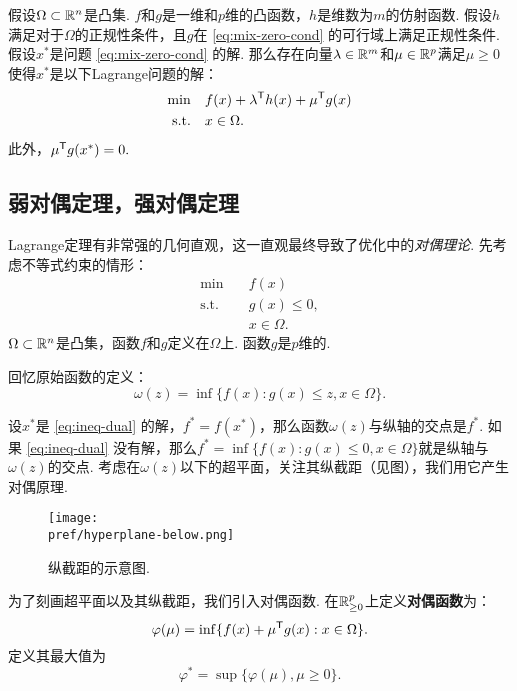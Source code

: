 \begin{theorem}\label{thm:mix-zero-cond}
假设$\Omega\subset \mathbb{R}^n$是凸集. $f$和${g}$是一维和$p$维的凸函数，${h}$是维数为$m$的仿射函数. 假设${h}$满足对于$\Omega$的正规性条件，且$g$在 \eqref{eq:mix-zero-cond} 的可行域上满足正规性条件. 假设${x^\ast}$是问题 \eqref{eq:mix-zero-cond} 的解. 那么存在向量${\lambda}\in \mathbb{R}^m$和${\mu}\in \mathbb{R}^p$满足${\mu}\ge {0}$使得${x^\ast}$是以下Lagrange问题的解：
\begin{align*}
\min\quad &f({x})+\lambda^{\mathsf{T}} h(x)+\mu^{\mathsf{T}} g(x) \\
\text{s.t.}\quad& x\in\Omega.
\end{align*}
此外，${\mu^{\mathsf{T}} g(x^\ast)}=0.$
\end{theorem}



\subsection{弱对偶定理，强对偶定理}
Lagrange定理有非常强的几何直观，这一直观最终导致了优化中的\emph{对偶理论}. 先考虑不等式约束的情形：
\begin{equation}
    \begin{aligned}
    \min\quad & f({x})\\
    \text{s.t.}\quad& {g(x)\le 0},\\
    &{x}\in\Omega.
\end{aligned}\label{eq:ineq-dual}
\end{equation}
$\Omega\subset \mathbb{R}^n$是凸集，函数$f$和${g}$定义在$\Omega$上. 函数${g}$是$p$维的. 

回忆原始函数的定义：
        $$\omega({z})=\inf \{f({x}):g(x)\le z,x\in\Omega\}.$$

设$x^\ast$是 \eqref{eq:ineq-dual} 的解，$f^\ast=f(x^\ast)$，那么函数$\omega(z)$与纵轴的交点是$f^*$. 如果 \eqref{eq:ineq-dual} 没有解，那么$f^*=\inf\{f(x):g(x)\leq 0,x\in\Omega\}$就是纵轴与$\omega(z)$的交点. 考虑在$\omega(z)$以下的超平面，关注其纵截距（见图），我们用它产生对偶原理.
\begin{figure}
    \centering
    \texttt{[image: \\pref/hyperplane-below.png]}
    \caption{纵截距的示意图.}
    \label{fig:hyperplane-below}
\end{figure}

为了刻画超平面以及其纵截距，我们引入对偶函数. 在$\mathbb{R}^p_{\geq 0}$上定义\textbf{对偶函数}为：
$$\varphi({\mu})=\inf \{f({x})+{\mu^{\mathsf{T}} g(x)}:{x}\in\Omega\}.$$
定义其最大值为
    \[\varphi^*=\sup\{\varphi(\mu),\mu\geq 0\}.\]


